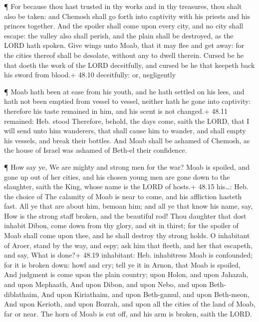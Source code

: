  ¶ For because thou hast trusted in thy works and in thy
treasures, thou shalt also be taken: and Chemosh shall go forth into
captivity with his priests and his princes together.  And
the spoiler shall come upon every city, and no city shall escape: the
valley also shall perish, and the plain shall be destroyed, as the LORD
hath spoken.  Give wings unto Moab, that it may flee and get
away: for the cities thereof shall be desolate, without any to dwell
therein.  Cursed be he that doeth the work of the LORD
deceitfully, and cursed be he that keepeth back his sword from blood.+
48.10 deceitfully: or, negligently

 ¶ Moab hath been at ease from his youth, and he hath
settled on his lees, and hath not been emptied from vessel to vessel,
neither hath he gone into captivity: therefore his taste remained in
him, and his scent is not changed.+ 48.11 remained: Heb. stood
 Therefore, behold, the days come, saith the LORD, that I
will send unto him wanderers, that shall cause him to wander, and shall
empty his vessels, and break their bottles.  And Moab shall
be ashamed of Chemosh, as the house of Israel was ashamed of Beth-el
their confidence.

 ¶ How say ye, We are mighty and strong men for the war?
 Moab is spoiled, and gone up out of her cities, and his
chosen young men are gone down to the slaughter, saith the King, whose
name is the LORD of hosts.+ 48.15 his\ldots: Heb. the choice of
 The calamity of Moab is near to come, and his affliction
hasteth fast.  All ye that are about him, bemoan him; and
all ye that know his name, say, How is the strong staff broken, and the
beautiful rod!  Thou daughter that dost inhabit Dibon, come
down from thy glory, and sit in thirst; for the spoiler of Moab shall
come upon thee, and he shall destroy thy strong holds.  O
inhabitant of Aroer, stand by the way, and espy; ask him that fleeth,
and her that escapeth, and say, What is done?+ 48.19 inhabitant: Heb.
inhabitress  Moab is confounded; for it is broken down:
howl and cry; tell ye it in Arnon, that Moab is spoiled, 
And judgment is come upon the plain country; upon Holon, and upon
Jahazah, and upon Mephaath,  And upon Dibon, and upon Nebo,
and upon Beth-diblathaim,  And upon Kiriathaim, and upon
Beth-gamul, and upon Beth-meon,  And upon Kerioth, and upon
Bozrah, and upon all the cities of the land of Moab, far or near.
 The horn of Moab is cut off, and his arm is broken, saith
the LORD.

